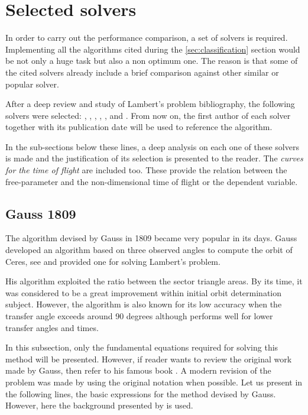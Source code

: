 \section{Selected solvers}

In order to carry out the performance comparison, a set of solvers is required.
Implementing all the algorithms cited during the \ref{sec:classification}
section would be not only a huge task but also a non optimum one. The reason is
that some of the cited solvers already include a brief comparison against other
similar or popular solver.

After a deep review and study of Lambert's problem bibliography, the following
solvers were selected: \cite{gauss1809}, \cite{battin1984}, \cite{gooding1990},
\cite{avanzini2008}, \cite{arora2013}, \cite{vallado2013} and \cite{izzo2015}.
From now on, the first author of each solver together with its publication date
will be used to reference the algorithm.

In the sub-sections below these lines, a deep analysis on each one of these
solvers is made and the justification of its selection is presented to the
reader. The \textit{curves for the time of flight} are included too. These
provide the relation between the free-parameter and the non-dimensional time of
flight or the dependent variable.

\subsection{Gauss 1809}

The algorithm devised by Gauss in 1809 became very popular in its days. Gauss
developed an algorithm based on three observed angles to compute the orbit of
Ceres, see \cite{bevdatvs2021} and provided one for solving Lambert's problem.

His algorithm exploited the ratio between the sector triangle areas. By its
time, it was considered to be a great improvement within initial orbit
determination subject. However, the algorithm is also known for its low accuracy
when the transfer angle exceeds around 90 degrees although performs well for
lower transfer angles and times.

In this subsection, only the fundamental equations required for solving this
method will be presented. However, if reader wants to review the original work
made by Gauss, then refer to his famous book . A modern
revision of the problem was made by \cite{teets1999} using the original notation
when possible. Let us present in the following lines, the basic expressions for
the method devised by Gauss. However, here the background presented by
\cite{bate1971} is used.

